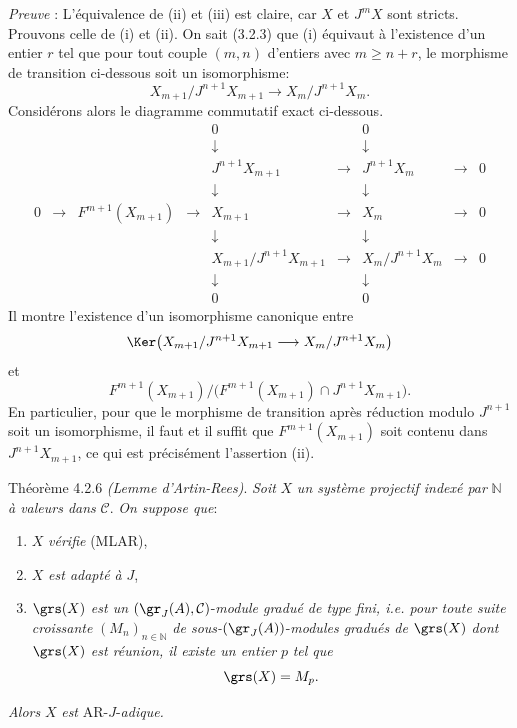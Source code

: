 \emph{Preuve} : L'équivalence de (ii) et (iii) est claire, car \(X\) et \(J^mX\) sont stricts. Prouvons celle de (i) et (ii). On sait (3.2.3) que (i) équivaut à l'existence d'un entier \(r\) tel que pour tout couple \((m,n)\) d'entiers avec \(m\ge n+r\), le morphisme de transition ci-dessous soit un isomorphisme:
\[
X_{m+1}/J^{n+1}X_{m+1}\longrightarrow X_m/J^{n+1}X_m.
\]
Considérons alors le diagramme commutatif exact ci-dessous.
\[
\begin{array}{ccccccccccc}
&&&&0&&0\\
&&&&\downarrow&&\downarrow\\
&&&&J^{n+1}X_{m+1}&\longrightarrow&J^{n+1}X_m&\longrightarrow&0\\
&&&&\downarrow&&\downarrow\\
0&\longrightarrow&F^{m+1}(X_{m+1})&\longrightarrow&X_{m+1}&\longrightarrow&X_m&\longrightarrow&0\\
&&&&\downarrow&&\downarrow\\
&&&&X_{m+1}/J^{n+1}X_{m+1}&\longrightarrow&X_m/J^{n+1}X_m&\longrightarrow&0\\
&&&&\downarrow&&\downarrow\\
&&&&0&&0
\end{array}
\]
Il
montre l'existence d'un isomorphisme canonique entre
\[
\Ker\bigl(X_{m+1}/J^{n+1}X_{m+1}
       \longrightarrow X_m/J^{n+1}X_m\bigr)
\]
et
\[
F^{m+1}(X_{m+1})/
\bigl(F^{m+1}(X_{m+1})\cap J^{n+1}X_{m+1}\bigr).
\]
En particulier, pour que le morphisme de transition après réduction modulo \(J^{n+1}\) soit un isomorphisme, il faut et il suffit que \(F^{m+1}(X_{m+1})\) soit contenu dans \(J^{n+1}X_{m+1}\), ce qui est précisément l'assertion (ii).

\begin{statement}{Théorème 4.2.6}
\emph{(Lemme d'Artin-Rees)}. \emph{Soit} \(X\) \emph{un système projectif indexé par} \(\mathbb{N}\) \emph{à valeurs dans} \(\mathcal{C}\). \emph{On suppose que}:
\begin{enumerate}[label=\textup{(\roman*)}]
\item \(X\) \emph{vérifie} (MLAR),
\item \(X\) \emph{est adapté à} \(J\),
\item \(\grs(X)\) \emph{est un} \((\gr_J(A),\mathcal{C})\)-\emph{module gradué de type fini, i.e. pour toute suite croissante} \((M_n)_{n\in\mathbb{N}}\) \emph{de sous-}\((\gr_J(A))\)-\emph{modules gradués de} \(\grs(X)\) \emph{dont} \(\grs(X)\) \emph{est réunion, il existe un entier} \(p\) \emph{tel que}
\[
\grs(X)=M_p.
\]
\end{enumerate}
\emph{Alors} \(X\) \emph{est} AR-\(J\)-\emph{adique.}
\end{statement}

